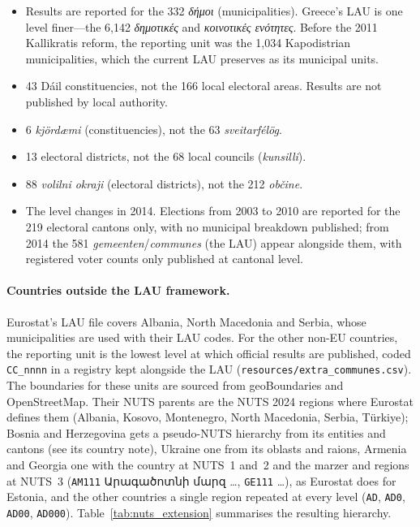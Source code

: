 \begin{itemize}\itemsep2pt
  \item[\textbf{EL}] Results are reported for the 332 \textit{δήμοι}
        (municipalities).  Greece's LAU is one level finer---the 6,142
        \textit{δημοτικές} and \textit{κοινοτικές ενότητες}.
        Before the 2011 Kallikratis reform,
        the reporting unit was the 1,034 Kapodistrian municipalities, which
        the current LAU preserves as its municipal units.
  \item[\textbf{IE}] 43 D\'ail constituencies, not the 166 local electoral
        areas.  Results are not published by local authority.
  \item[\textbf{IS}] 6 \textit{kj\"ord\ae mi} (constituencies), not the
        63 \textit{sveitarf\'el\"og}.
  \item[\textbf{MT}] 13 electoral districts, not the 68 local councils
        (\textit{kunsilli}).
  \item[\textbf{SI}] 88 \textit{volilni okraji} (electoral districts), not
        the 212 \textit{ob\v{c}ine}.
  \item[\textbf{BE}] The level changes in 2014.  Elections from 2003 to 2010
        are reported for the 219 electoral cantons only, with no municipal
        breakdown published; from 2014 the 581
        \textit{gemeenten}/\textit{communes} (the LAU) appear alongside them,
        with registered voter counts only published at cantonal level.
\end{itemize}

\paragraph{Countries outside the LAU framework.}
Eurostat's LAU file covers Albania, North Macedonia and Serbia, whose
municipalities are used with their LAU codes.  For the other non-EU countries,
the reporting unit is the lowest level at which official results are
published, coded \texttt{CC\_nnnn} in a registry kept alongside the LAU
(\texttt{resources/extra\_communes.csv}). The boundaries
for these units are sourced from geoBoundaries and OpenStreetMap.
Their NUTS parents
are the NUTS 2024 regions where Eurostat defines them (Albania, Kosovo,
Montenegro, North Macedonia, Serbia, Türkiye); Bosnia and Herzegovina gets a
pseudo-NUTS hierarchy from its entities and cantons (see its country note),
Ukraine one from its oblasts and raions, Armenia and Georgia one with the
country at NUTS~1 and~2 and the marzer and regions at NUTS~3
(\texttt{AM111} {\caucasusfont Արագածոտնի մարզ} \ldots, \texttt{GE111} \ldots), as Eurostat
does for Estonia, and the other countries a single region repeated at every
level (\texttt{AD}, \texttt{AD0}, \texttt{AD00}, \texttt{AD000}).
Table~\ref{tab:nuts_extension} summarises the resulting hierarchy.

